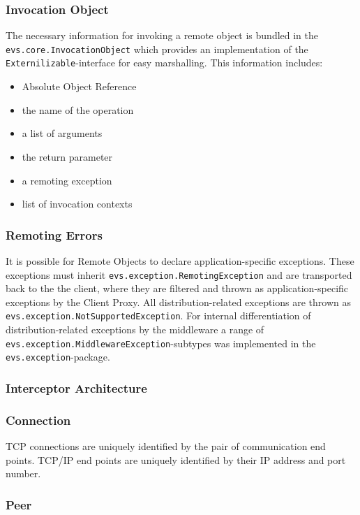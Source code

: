 \subsubsection{Invocation Object}
The necessary information for invoking a remote object is bundled in the \texttt{evs.core.InvocationObject} which provides an implementation of the \texttt{Externilizable}-interface for easy marshalling. This information includes:
\begin{itemize}\itemsep0pt
\item Absolute Object Reference
\item the name of the operation
\item a list of arguments
\item the return parameter
\item a remoting exception
\item list of invocation contexts
\end{itemize}

\subsubsection{Remoting Errors}
It is possible for Remote Objects to declare application-specific exceptions. These exceptions must inherit \texttt{evs.exception.RemotingException} and are transported back to the the client, where they are filtered and thrown as application-specific exceptions by the Client Proxy. All distribution-related exceptions are thrown as \texttt{evs.exception.NotSupportedException}. For internal differentiation of distribution-related exceptions by the middleware a range of \texttt{evs.exception.MiddlewareException}-subtypes was implemented in the \texttt{evs.exception}-package.

\subsubsection{Interceptor Architecture}


\subsubsection{Connection}

TCP connections are uniquely identified by the pair of communication end points.
TCP/IP end points are uniquely identified by their IP address and port number.

\subsubsection{Peer}

